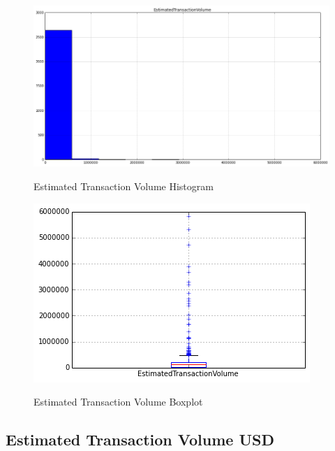 \begin{figure}[bth]
  \myfloatalign
  {\includegraphics[width=1\linewidth]
    {gfx/estimated-transaction-volume-histogram}}
  \caption{Estimated Transaction Volume Histogram}
  \label{fig:estimated-transaction-volume-histogram}
\end{figure}

\begin{figure}[bth]
  \myfloatalign
  {\includegraphics[width=1\linewidth]
    {gfx/estimated-transaction-volume-boxplot}}
  \caption{Estimated Transaction Volume Boxplot}
  \label{fig:estimated-transaction-volume-boxplot}
\end{figure}

\clearpage

\subsection{Estimated Transaction Volume USD}
\label{sec:estimated-transaction-volume-usd}

